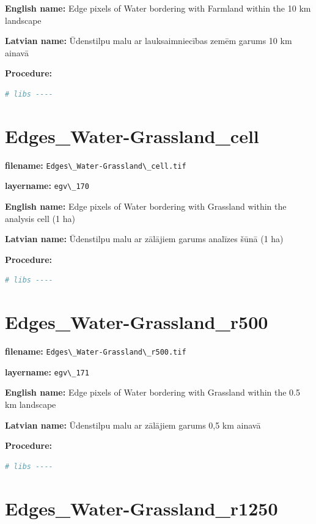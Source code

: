 \documentclass[
]{book}
\newcommand{\passthrough}[1]{#1}
\begin{document}
\textbf{English name:} Edge pixels of Water bordering with Farmland within the 10 km landscape

\textbf{Latvian name:} Ūdenstilpu malu ar lauksaimniecības zemēm garums 10 km ainavā

\textbf{Procedure:}

\begin{lstlisting}[language=R]
# libs ----
\end{lstlisting}

\section{Edges\_Water-Grassland\_cell}\label{ch06.170}

\textbf{filename:} \passthrough{\lstinline!Edges\_Water-Grassland\_cell.tif!}

\textbf{layername:} \passthrough{\lstinline!egv\_170!}

\textbf{English name:} Edge pixels of Water bordering with Grassland within the analysis cell (1 ha)

\textbf{Latvian name:} Ūdenstilpu malu ar zālājiem garums analīzes šūnā (1 ha)

\textbf{Procedure:}

\begin{lstlisting}[language=R]
# libs ----
\end{lstlisting}

\section{Edges\_Water-Grassland\_r500}\label{ch06.171}

\textbf{filename:} \passthrough{\lstinline!Edges\_Water-Grassland\_r500.tif!}

\textbf{layername:} \passthrough{\lstinline!egv\_171!}

\textbf{English name:} Edge pixels of Water bordering with Grassland within the 0.5 km landscape

\textbf{Latvian name:} Ūdenstilpu malu ar zālājiem garums 0,5 km ainavā

\textbf{Procedure:}

\begin{lstlisting}[language=R]
# libs ----
\end{lstlisting}

\section{Edges\_Water-Grassland\_r1250}\label{ch06.172}
\end{document}
